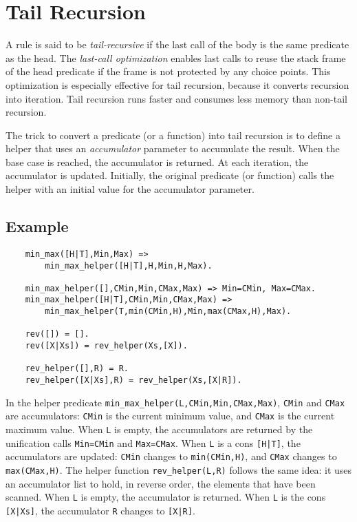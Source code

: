 \section{Tail Recursion}
A rule is said to be \emph{tail-recursive} if the last call of the body is the same predicate as the head. The \emph{last-call optimization} enables last calls to reuse the stack frame of the head predicate if the frame is not protected by any choice points. This optimization is especially effective for tail recursion, because it converts recursion into iteration. Tail recursion runs faster and consumes less memory than non-tail recursion.

The trick to convert a predicate (or a function) into tail recursion is to define a helper that uses an \emph{accumulator} parameter to accumulate the result. When the base case is reached, the accumulator is returned. At each iteration, the accumulator is updated. Initially, the original predicate (or function) calls the helper with an initial value for the accumulator parameter.


\subsection*{Example}
\begin{verbatim}
    min_max([H|T],Min,Max) => 
        min_max_helper([H|T],H,Min,H,Max).

    min_max_helper([],CMin,Min,CMax,Max) => Min=CMin, Max=CMax.
    min_max_helper([H|T],CMin,Min,CMax,Max) => 
        min_max_helper(T,min(CMin,H),Min,max(CMax,H),Max).

    rev([]) = [].
    rev([X|Xs]) = rev_helper(Xs,[X]).

    rev_helper([],R) = R.
    rev_helper([X|Xs],R) = rev_helper(Xs,[X|R]).
\end{verbatim}
In the helper predicate \texttt{min\_max\_helper(L,CMin,Min,CMax,Max)}, \texttt{CMin} and \texttt{CMax} are accumulators: \texttt{CMin} is the current minimum value, and \texttt{CMax} is the current maximum value. When \texttt{L} is empty, the accumulators are returned by the unification calls \texttt{Min=CMin} and \texttt{Max=CMax}. When \texttt{L} is a cons \texttt{[H|T]}, the accumulators are updated: \texttt{CMin} changes to \texttt{min(CMin,H)}, and \texttt{CMax} changes to \texttt{max(CMax,H)}. The helper function \texttt{rev\_helper(L,R)} follows the same idea: it uses an accumulator list to hold, in reverse order, the elements that have been scanned. When \texttt{L} is empty, the accumulator is returned. When \texttt{L} is the cons \texttt{[X|Xs]}, the accumulator \texttt{R} changes to \texttt{[X|R]}.
\ignore{

}



